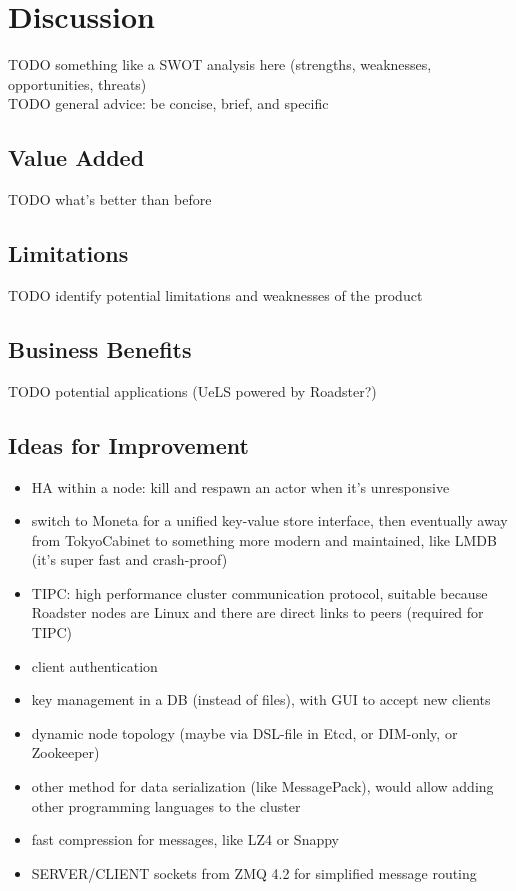 \chapter{Discussion}
TODO something like a SWOT analysis here (strengths, weaknesses, opportunities, threats)\\
TODO general advice: be concise, brief, and specific\\

\section{Value Added}
TODO what's better than before\\

\section{Limitations}
TODO identify potential limitations and weaknesses of the product\\

\section{Business Benefits}
TODO potential applications (UeLS powered by Roadster?)\\

\section{Ideas for Improvement}
\begin{itemize}
	\item HA within a node: kill and respawn an actor when it's unresponsive
	\item switch to Moneta for a unified key-value store interface, then eventually away from TokyoCabinet to something more modern and maintained, like LMDB (it's super fast and crash-proof)
	\item TIPC: high performance cluster communication protocol, suitable because Roadster nodes are Linux and there are direct links to peers (required for TIPC)
	\item client authentication
	\item key management in a DB (instead of files), with GUI to accept new clients
	\item dynamic node topology (maybe via DSL-file in Etcd, or DIM-only, or Zookeeper)
	\item other method for data serialization (like MessagePack), would allow adding other programming languages to the cluster
	\item fast compression for messages, like LZ4 or Snappy
	\item SERVER/CLIENT sockets from ZMQ 4.2 for simplified message routing
\end{itemize}
